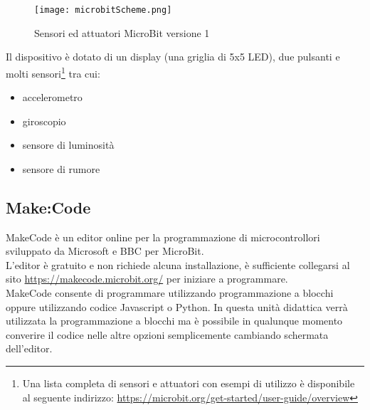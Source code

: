 \documentclass[../../docenti.tex]{subfiles}
\begin{document}
\begin{figure}[H]
 	\centering
 	\texttt{[image: microbitScheme.png]}
 	\caption{Sensori ed attuatori MicroBit versione 1 \parencite{MicrobitOverview}}
 	\label{fig:microbit}
\end{figure}

Il dispositivo è dotato di un display (una griglia di 5x5 LED), due pulsanti e molti sensori\footnote{Una lista completa di sensori e attuatori con esempi di utilizzo è disponibile al seguente indirizzo: \url{https://microbit.org/get-started/user-guide/overview}} tra cui:
\begin{itemize}
	\item accelerometro
	\item giroscopio
	\item sensore di luminosità
	\item sensore di rumore
\end{itemize}

\subsection{Make:Code}
MakeCode è un editor online per la programmazione di microcontrollori sviluppato da Microsoft e BBC per MicroBit.\\
L'editor è gratuito e non richiede alcuna installazione, è sufficiente collegarsi al sito \url{https://makecode.microbit.org/} per iniziare a programmare.\\

MakeCode consente di programmare utilizzando programmazione a blocchi oppure utilizzando codice Javascript o Python. In questa unità didattica verrà utilizzata la programmazione a blocchi ma è possibile in qualunque momento converire il codice nelle altre opzioni semplicemente cambiando schermata dell'editor.
\end{document}
